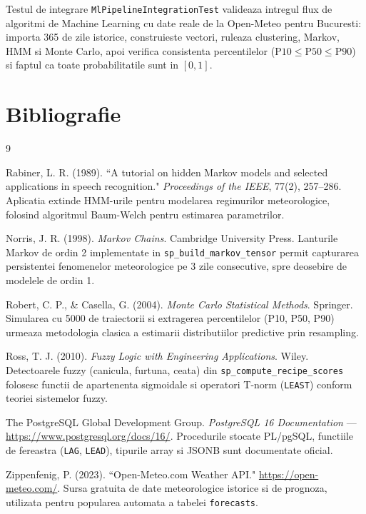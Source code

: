 \documentclass[12pt,a4paper]{article}
\begin{document}
Testul de integrare \texttt{MlPipelineIntegrationTest} valideaza intregul flux de algoritmi de Machine Learning cu date reale de la Open-Meteo pentru Bucuresti: importa 365 de zile istorice, construieste vectori, ruleaza clustering, Markov, HMM si Monte Carlo, apoi verifica consistenta percentilelor ($\text{P10} \leq \text{P50} \leq \text{P90}$) si faptul ca toate probabilitatile sunt in $[0, 1]$.

\section{Bibliografie}

\begin{thebibliography}{9}

 Rabiner, L. R. (1989). ``A tutorial on hidden Markov models and selected applications in speech recognition." \textit{Proceedings of the IEEE}, 77(2), 257--286. Aplicatia extinde HMM-urile pentru modelarea regimurilor meteorologice, folosind algoritmul Baum-Welch pentru estimarea parametrilor.

 Norris, J. R. (1998). \textit{Markov Chains}. Cambridge University Press. Lanturile Markov de ordin 2 implementate in \texttt{sp\_build\_markov\_tensor} permit capturarea persistentei fenomenelor meteorologice pe 3 zile consecutive, spre deosebire de modelele de ordin 1.

 Robert, C. P., \& Casella, G. (2004). \textit{Monte Carlo Statistical Methods}. Springer. Simularea cu 5000 de traiectorii si extragerea percentilelor (P10, P50, P90) urmeaza metodologia clasica a estimarii distributiilor predictive prin resampling.

 Ross, T. J. (2010). \textit{Fuzzy Logic with Engineering Applications}. Wiley. Detectoarele fuzzy (canicula, furtuna, ceata) din \texttt{sp\_compute\_recipe\_scores} folosesc functii de apartenenta sigmoidale si operatori T-norm (\texttt{LEAST}) conform teoriei sistemelor fuzzy.

 The PostgreSQL Global Development Group. \textit{PostgreSQL 16 Documentation} --- \url{https://www.postgresql.org/docs/16/}. Procedurile stocate PL/pgSQL, functiile de fereastra (\texttt{LAG}, \texttt{LEAD}), tipurile array si JSONB sunt documentate oficial.

 Zippenfenig, P. (2023). ``Open-Meteo.com Weather API." \url{https://open-meteo.com/}. Sursa gratuita de date meteorologice istorice si de prognoza, utilizata pentru popularea automata a tabelei \texttt{forecasts}.


\end{thebibliography}
\end{document}
